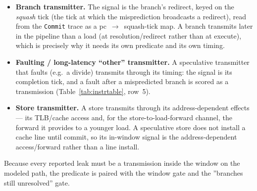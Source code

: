 \begin{itemize}
  

  \item \textbf{Branch transmitter.} The signal is the branch's redirect, keyed on the \emph{squash} tick (the tick at which the misprediction broadcasts a redirect), read from the \texttt{Commit} trace as a pc~$\rightarrow$~squash-tick map. A branch transmits later in the pipeline than a load (at resolution/redirect rather than at execute), which is precisely why it needs its own predicate and its own timing.

  \item \textbf{Faulting / long-latency ``other'' transmitter.} A speculative transmitter that faults (e.g.\ a divide) transmits through its timing: the signal is its completion tick, and a fault after a mispredicted branch is scored as a transmission (Table~\ref{tab:instrtable}, row~5).

  \item \textbf{Store transmitter.} A store transmits through its address-dependent effects --- its TLB/cache access and, for the store-to-load-forward channel, the forward it provides to a younger load. A speculative store does not install a cache line until commit, so its in-window signal is the address-dependent access/forward rather than a line install.
\notebr
{}
\notebr
\end{itemize}
Because every reported leak must be a transmission inside the window on the modeled path, the predicate is paired with the window gate and the ''branches still unresolved'' gate.
\notebr
{}
\notebr


